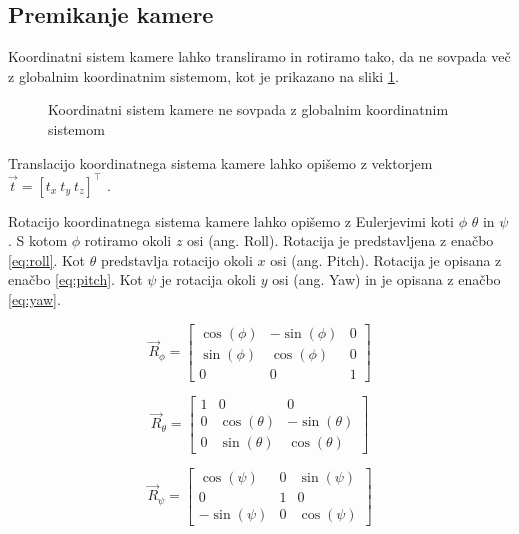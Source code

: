 \subsection{Premikanje kamere}
Koordinatni sistem kamere lahko transliramo in rotiramo tako, da ne sovpada več z globalnim koordinatnim sistemom, kot je prikazano na sliki \ref{fig:premikanje-kamere}. 

\begin{figure}[htb]
\centering

\caption{Koordinatni sistem kamere ne sovpada z globalnim koordinatnim sistemom}
\label{fig:premikanje-kamere}
\end{figure}

Translacijo koordinatnega sistema kamere lahko opišemo z vektorjem $\vec{t} = \left[t_x~t_y~t_z\right]^\top$ \cite{trucco1998introductory}. 

Rotacijo koordinatnega sistema kamere lahko opišemo z Eulerjevimi koti $\phi$ $\theta$ in $\psi$ \cite{bajd2011osnove}. S kotom $\phi$ rotiramo okoli $z$ osi (ang. Roll). Rotacija je predstavljena z enačbo \eqref{eq:roll}. Kot $\theta$ predstavlja rotacijo okoli $x$ osi (ang. Pitch). Rotacija je opisana z enačbo \eqref{eq:pitch}. Kot $\psi$ je rotacija okoli $y$ osi (ang. Yaw) in je opisana z enačbo \eqref{eq:yaw}.

\begin{equation}
\vec{R}_\phi = \begin{bmatrix}
\cos(\phi) & - \sin(\phi) & 0 \\
\sin(\phi) & \cos(\phi) & 0 \\
0 & 0 & 1
\end{bmatrix}
\label{eq:roll}
\end{equation}

\begin{equation}
\vec{R}_\theta = \begin{bmatrix}
1 & 0 & 0 \\
0 & \cos(\theta) & - \sin(\theta) \\
0 & \sin(\theta) & \cos(\theta)
\end{bmatrix}
\label{eq:pitch}
\end{equation}

\begin{equation}
\vec{R}_\psi = \begin{bmatrix}
\cos(\psi) & 0 & \sin(\psi) \\
0 & 1 & 0 \\
- \sin(\psi) & 0 & \cos(\psi) 
\end{bmatrix}
\label{eq:yaw}
\end{equation}


